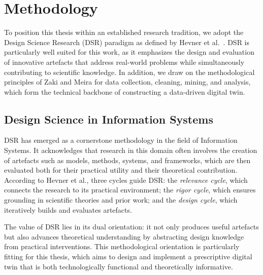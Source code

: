 \section{Methodology}
\label{sec:intro:meth}

To position this thesis within an established research tradition, we adopt the Design Science Research (DSR) paradigm as defined by Hevner et al.\ \cite{Hevner2004}. DSR is particularly well suited for this work, as it emphasizes the design and evaluation of innovative artefacts that address real-world problems while simultaneously contributing to scientific knowledge. In addition, we draw on the methodological principles of Zaki and Meira \cite{Zaki2020} for data collection, cleaning, mining, and analysis, which form the technical backbone of constructing a data-driven digital twin.

\subsection*{Design Science in Information Systems}
DSR has emerged as a cornerstone methodology in the field of Information Systems. It acknowledges that research in this domain often involves the creation of artefacts such as models, methods, systems, and frameworks, which are then evaluated both for their practical utility and their theoretical contribution. According to Hevner et al., three cycles guide DSR: the \textit{relevance cycle}, which connects the research to its practical environment; the \textit{rigor cycle}, which ensures grounding in scientific theories and prior work; and the \textit{design cycle}, which iteratively builds and evaluates artefacts.

The value of DSR lies in its dual orientation: it not only produces useful artefacts but also advances theoretical understanding by abstracting design knowledge from practical interventions. This methodological orientation is particularly fitting for this thesis, which aims to design and implement a prescriptive digital twin that is both technologically functional and theoretically informative.

